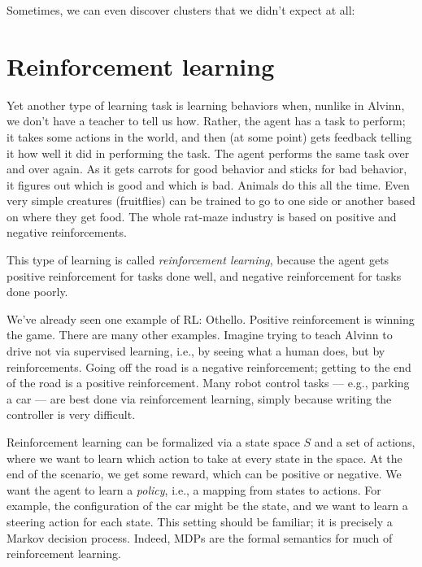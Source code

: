
Sometimes, we can even discover clusters that we didn't expect at all:


\section{Reinforcement learning}

Yet another type of learning task is learning behaviors when, nunlike in
Alvinn, we don't have a teacher to tell us how.  Rather, the agent has a
task to perform; it takes some actions in the world, and then (at
some point) gets feedback telling it how well it did in performing the task.
The agent performs the same task over and over again.  As it gets carrots for
good behavior and sticks for bad behavior, it figures out which is good and
which is bad.  Animals do this all the time.  Even very simple creatures
(fruitflies) can be trained to go to one side or another based on where they
get food.  The whole rat-maze industry is based on positive and negative
reinforcements. 

This type of learning is called {\em reinforcement learning}, because the
agent gets positive reinforcement for tasks done well, and negative
reinforcement for tasks done poorly.

We've already seen one example of RL: Othello.  Positive reinforcement is
winning the game.  There are many other examples.  Imagine trying to teach
Alvinn to drive not via supervised learning, i.e., by seeing what a human
does, but by reinforcements.  Going off the road is a negative reinforcement;
getting to the end of the road is a positive reinforcement.  Many robot
control tasks --- e.g., parking a car --- are best done via reinforcement
learning, simply because writing the controller is very difficult.

Reinforcement learning can be formalized via a state space $S$ and a set of 
actions, where we want to learn which action to take at every state in the
space.  At the end of the scenario, we get some reward, which can be positive
or negative.  We want the agent to learn a {\em policy\/}, i.e., a mapping
from states to actions.  For example, the configuration of the car might be
the state, and we want to learn a steering action for each state.
This setting should be familiar; it is precisely a Markov decision process.
Indeed, MDPs are the formal semantics for much of reinforcement learning.

